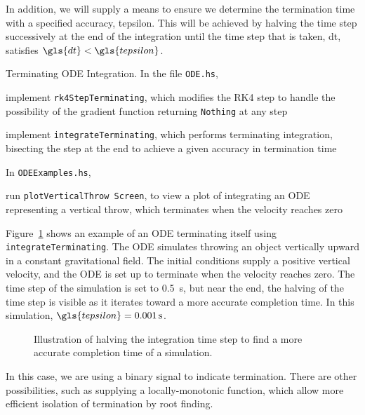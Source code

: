 \documentclass[12pt,openany]{book}
\newcommand{\filename}[1]{\texttt{#1}}  %
\newcommand{\code}[1]{\texttt{#1}}      %
\begin{document}
In addition, we will supply a means to ensure we determine the termination time with a specified accuracy, \gls{tepsilon}. This will be achieved by halving the time step successively at the end of the integration until the time step that is taken, \gls{dt}, satisfies \(\gls{dt} < \gls{tepsilon}\).

\begin{problem}[label=terminatingIntegration]{Terminating ODE Integration.}
  In the file \filename{ODE.hs},
  \begin{probitemize}
  \item implement \code{rk4StepTerminating}, which modifies the RK4 step to handle the possibility of the gradient function returning \code{Nothing} at any step
  \item implement \code{integrateTerminating}, which performs terminating integration, bisecting the step at the end to achieve a given accuracy in termination time
  \end{probitemize}
  In \filename{ODEExamples.hs},
  \begin{probitemize}
  \item run \code{plotVerticalThrow Screen}, to view a plot of integrating an ODE representing a vertical throw, which terminates when the velocity reaches zero
  \end{probitemize}
\end{problem}

Figure~\ref{fig:vertical-throw} shows an example of an ODE terminating itself using \code{integrateTerminating}. The ODE simulates throwing an object vertically upward in a constant gravitational field. The initial conditions supply a positive vertical velocity, and the ODE is set up to terminate when the velocity reaches zero. The time step of the simulation is set to \SI{0.5}{\s}, but near the end, the halving of the time step is visible as it iterates toward a more accurate completion time. In this simulation, \(\gls{tepsilon}=\SI{0.001}{\s}\).

\begin{figure}[htbp]
  \resizebox{\textwidth}{!}{}
  \caption{Illustration of halving the integration time step to find a more accurate completion time of a simulation.}
  \label{fig:vertical-throw}
\end{figure}

In this case, we are using a binary signal to indicate termination. There are other possibilities, such as supplying a locally-monotonic function, which allow more efficient isolation of termination by root finding.
\end{document}
